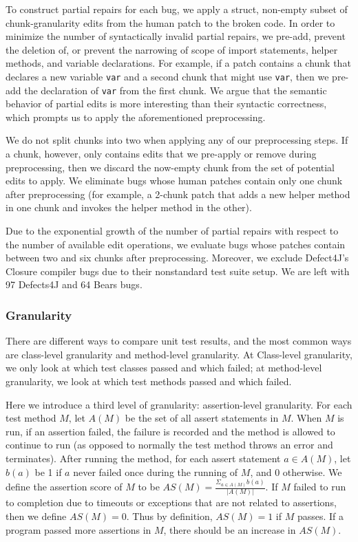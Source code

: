 \documentclass[sigconf, timestamp-false, anonymous=true]{acmart}
\begin{document}
To construct partial repairs for each bug, we apply a struct, non-empty subset 
of chunk-granularity edits from the human patch to the broken code.
In order to minimize the number of syntactically invalid partial repairs, 
we pre-add, prevent the deletion of, or prevent the narrowing of scope of 
import statements, helper methods, and variable declarations.
For example, if a patch contains a chunk that declares a new variable 
\texttt{var} and a second chunk that might use \texttt{var}, then we 
pre-add the declaration of \texttt{var} from the first chunk. 
We argue that the semantic behavior of partial edits is more interesting 
than their syntactic correctness, which prompts us to apply the 
aforementioned preprocessing.

We do not split chunks into two when applying any of our preprocessing steps. 
If a chunk, however, only contains edits that we pre-apply or remove during 
preprocessing, then we discard the now-empty chunk from the set of 
potential edits to apply. We eliminate bugs whose human patches contain only 
one chunk after preprocessing (for example, a 2-chunk patch that adds a new 
helper method in one chunk and invokes the helper method in the other). 

Due to the exponential growth of the number of partial repairs with respect 
to the number of available edit operations, we evaluate bugs whose patches 
contain between two and six chunks after preprocessing.
Moreover, we exclude Defect4J's Closure compiler bugs due to 
their nonstandard test suite setup.
We are left with 97 Defects4J and 64 Bears bugs.

\subsubsection{Granularity}

There are different ways to compare unit test results, and the most common ways 
are class-level granularity and method-level granularity. At Class-level granularity, 
we only look at which test classes passed and which failed; at method-level 
granularity, we look at which test methods passed and which failed.

Here we introduce a third level of granularity: assertion-level granularity. 
For each test method $M$, let $A(M)$ be the set of all assert statements in $M$. 
When $M$ is run, if an assertion failed, the failure is recorded and the method 
is allowed to continue to run (as opposed to normally the test method throws an 
error and terminates). After running the method, for each assert statement 
$a\in A(M)$, let $b(a)$ be 1 if $a$ never failed once during the running of $M$, 
and 0 otherwise. We define the assertion score of $M$ to be 
$AS(M)=\frac{\Sigma_{a\in A(M)}b(a)}{|A(M)|}$. If $M$ failed to run to completion 
due to timeouts or exceptions that are not related to assertions, then we define 
$AS(M)=0$. Thus by definition, $AS(M)=1$ if $M$ passes. If a program passed more 
assertions in $M$, there should be an increase in $AS(M)$.
\end{document}
